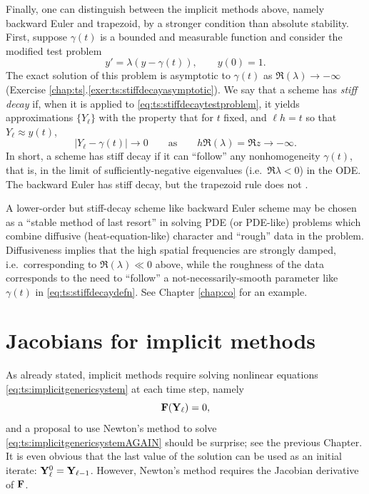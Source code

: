 Finally, one can distinguish between the implicit methods above, namely backward Euler and trapezoid, by a stronger condition than absolute stability.  First, suppose $\gamma(t)$ is a bounded and measurable function and consider the modified test problem
\begin{equation}
y' = \lambda \left(y - \gamma(t)\right), \qquad y(0)=1. \label{eq:ts:stiffdecaytestproblem}
\end{equation}
The exact solution of this problem is asymptotic to $\gamma(t)$ as $\Re(\lambda) \to -\infty$ (Exercise \ref{chap:ts}.\ref{exer:ts:stiffdecayasymptotic}).  We say that a scheme has \emph{stiff decay} if, when it is applied to \eqref{eq:ts:stiffdecaytestproblem}, it yields approximations $\{Y_\ell\}$ with the property that for $t$ fixed, and $\ell h = t$ so that $Y_\ell \approx y(t)$,
\begin{equation}
|Y_\ell - \gamma(t)| \to 0 \qquad \text{as} \qquad h \Re(\lambda) = \Re z \to -\infty. \label{eq:ts:stiffdecaydefn}
\end{equation}
In short, a scheme has stiff decay if it can ``follow'' any nonhomogeneity $\gamma(t)$, that is, in the limit of sufficiently-negative eigenvalues (i.e.~$\Re \lambda < 0$) in the ODE.  The backward Euler has stiff decay, but the trapezoid rule does not \citep{AscherPetzold1998}.

A lower-order but stiff-decay scheme like backward Euler scheme may be chosen as a ``stable method of last resort'' in solving PDE (or PDE-like) problems which combine diffusive (heat-equation-like) character and ``rough'' data in the problem.  Diffusiveness implies that the high spatial frequencies are strongly damped, i.e.~corresponding to $\Re(\lambda)\ll 0$ above, while the roughness of the data corresponds to the need to ``follow'' a not-necessarily-smooth parameter like $\gamma(t)$ in \eqref{eq:ts:stiffdecaydefn}.  See Chapter \ref{chap:co} for an example.



\section{Jacobians for implicit methods}

As already stated, implicit methods require solving nonlinear equations \eqref{eq:ts:implicitgenericsystem} at each time step, namely
\begin{equation}
  \mathbf{F}(\mathbf{Y}_\ell) = 0, \label{eq:ts:implicitgenericsystemAGAIN}
\end{equation}
and a proposal to use Newton's method to solve \eqref{eq:ts:implicitgenericsystemAGAIN} should be surprise; see the previous Chapter.  It is even obvious that the last value of the solution can be used as an initial iterate: $\mathbf{Y}_\ell^0 = \mathbf{Y}_{\ell-1}$.  However, Newton's method requires the Jacobian derivative of $\mathbf{F}$.

